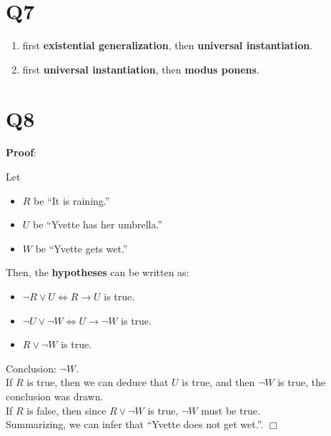 \documentclass[11pt]{article}
\newenvironment{qparts}{\begin{enumerate}[{(}a{)}]}{\end{enumerate}}
\def\endproofmark{$\Box$}
\newenvironment{proof}{\par{\bf Proof}:}{\endproofmark\smallskip}
\begin{document}
\section*{Q7}
\begin{qparts}
    
    \item first \textbf{existential generalization}, then \textbf{universal instantiation}. 
    \item first \textbf{universal instantiation}, then \textbf{modus ponens}.
\end{qparts}

\section*{Q8}
\begin{proof}
    
    Let
    \begin{itemize}
        
        \item $R$ be ``It is raining.''
        \item $U$ be ``Yvette has her umbrella.''
        \item $W$ be ``Yvette gets wet.''
    \end{itemize}
    Then, the \textbf{hypotheses} can be written as:
    \begin{itemize}
        
        \item $\lnot R\lor U \iff R\to U$ is true.
        \item $\lnot U \lor \lnot W \iff U \to \lnot W$ is true.
        \item $R \lor \lnot W$ is true.
    \end{itemize}
    Conclusion: $\lnot W$.\\
    If $R$ is true, then we can deduce that $U$ is true, and then
    $\lnot W$ is true, the conclusion was drawn.\\
    If $R$ is false, then since $R\lor \lnot W$ is true, $\lnot W$ must be true.
    \\
    Summarizing, we can infer that ``Yvette does not get wet.''.
\end{proof}
\end{document}
